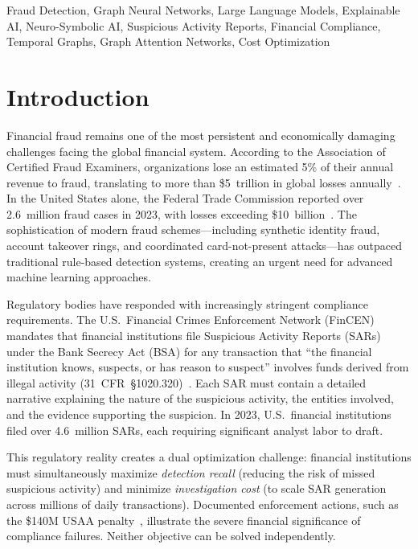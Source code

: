 \documentclass[journal]{IEEEtran}
\begin{document}
\begin{IEEEkeywords}
Fraud Detection, Graph Neural Networks, Large Language Models, Explainable AI, Neuro-Symbolic AI, Suspicious Activity Reports, Financial Compliance, Temporal Graphs, Graph Attention Networks, Cost Optimization
\end{IEEEkeywords}

\section{Introduction}

Financial fraud remains one of the most persistent and economically damaging challenges facing the global financial system. According to the Association of Certified Fraud Examiners, organizations lose an estimated 5\% of their annual revenue to fraud, translating to more than \$5~trillion in global losses annually~\cite{acfe2024}. In the United States alone, the Federal Trade Commission reported over 2.6~million fraud cases in 2023, with losses exceeding \$10~billion~\cite{ftc2024}. The sophistication of modern fraud schemes---including synthetic identity fraud, account takeover rings, and coordinated card-not-present attacks---has outpaced traditional rule-based detection systems, creating an urgent need for advanced machine learning approaches.

Regulatory bodies have responded with increasingly stringent compliance requirements. The U.S.\ Financial Crimes Enforcement Network (FinCEN) mandates that financial institutions file Suspicious Activity Reports (SARs) under the Bank Secrecy Act (BSA) for any transaction that ``the financial institution knows, suspects, or has reason to suspect'' involves funds derived from illegal activity (31~CFR~\S1020.320)~\cite{fincen2020}. Each SAR must contain a detailed narrative explaining the nature of the suspicious activity, the entities involved, and the evidence supporting the suspicion. In 2023, U.S.\ financial institutions filed over 4.6~million SARs, each requiring significant analyst labor to draft.

This regulatory reality creates a dual optimization challenge: financial institutions must simultaneously maximize \emph{detection recall} (reducing the risk of missed suspicious activity) and minimize \emph{investigation cost} (to scale SAR generation across millions of daily transactions). Documented enforcement actions, such as the \$140M USAA penalty~\cite{fincen2022usaa}, illustrate the severe financial significance of compliance failures. Neither objective can be solved independently.
\end{document}
